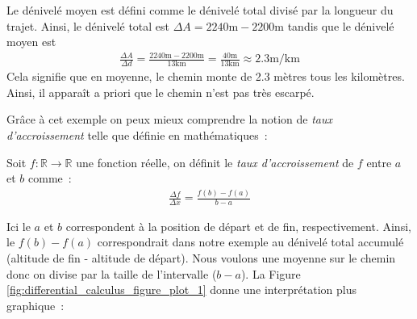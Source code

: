 Le dénivelé moyen est défini comme le dénivelé total divisé par la longueur du trajet. Ainsi, le dénivelé total est $\Delta A = 2240 \mathrm{m} - 2200 \mathrm{m}$ tandis que le dénivelé moyen est 
\begin{align*}
    \frac{\Delta A}{\Delta d} = \frac{2240 \mathrm{m} - 2200 \mathrm{m}}{13 \mathrm{ km}} = \frac{40 \mathrm{ m}}{13 \mathrm{ km}} \approx 2.3 \mathrm{ m}/\mathrm{km}
\end{align*}
Cela signifie que en moyenne, le chemin monte de 2.3 mètres tous les kilomètres. Ainsi, il apparaît a priori que le chemin n'est pas très escarpé. 


\smallskip

Grâce à cet exemple on peux mieux comprendre la notion de \emph{taux d'accroissement} telle que définie en mathématiques~:
\begin{boxdef}
Soit $f : \mathbb{R} \to \mathbb{R}$ une fonction réelle, on définit le \emph{taux d'accroissement} de $f$ entre $a$ et $b$ comme~:
\begin{align*}
    \frac{\Delta f}{\Delta x} = \frac{f(b) - f(a)}{b - a}
\end{align*}
\end{boxdef}
Ici le $a$ et $b$ correspondent à la position de départ et de fin, respectivement. Ainsi, le $f(b) - f(a)$ correspondrait dans notre exemple au dénivelé total accumulé (altitude de fin - altitude de départ). Nous voulons une moyenne sur le chemin donc on divise par la taille de l'intervalle ($b - a$). La Figure \ref{fig:differential_calculus_figure_plot_1} donne une interprétation plus graphique~:
